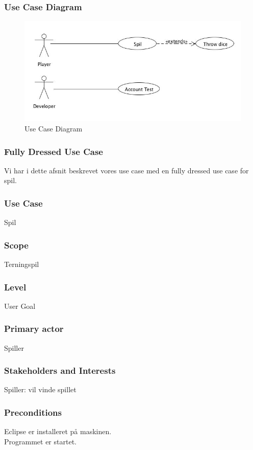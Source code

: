 \subsubsection{Use Case Diagram}
\begin{figure}[ht]
\centering
\includegraphics[scale=0.5]{UseCaseDiagram.jpg}
\caption[<Text for the list of figures>]{Use Case Diagram}
\label{fig:figure 2}
\end{figure}
\newpage
\subsubsection{Fully Dressed Use Case}
Vi har i dette afsnit beskrevet vores use case med en fully dressed use case for spil.
\subsubsection*{Use Case}
Spil
\subsubsection*{Scope}
Terningspil
\subsubsection*{Level}
User Goal
\subsubsection*{Primary actor}
Spiller
\subsubsection*{Stakeholders and Interests}
Spiller: vil vinde spillet
\subsubsection*{Preconditions}
Eclipse er installeret på maskinen.
\\
Programmet er startet.
